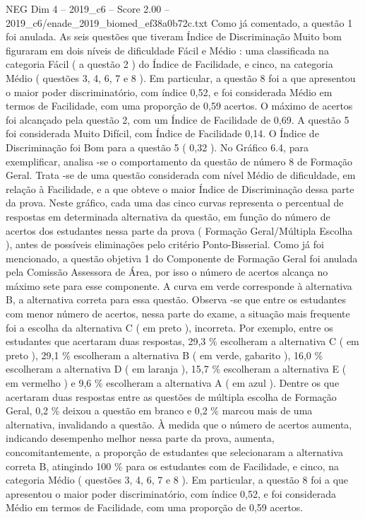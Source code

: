 \begin{textsample}{NEG Dim 4 – 2019\_c6 – Score 2.00 – 2019\_c6/enade\_2019\_biomed\_ef38a0b72c.txt}
Como já comentado, a questão 1 foi anulada.
As seis questões que tiveram Índice de Discriminação Muito bom figuraram em dois níveis de dificuldade Fácil e Médio : uma classificada na categoria Fácil ( a questão 2 ) do Índice de Facilidade, e cinco, na categoria Médio ( questões 3, 4, 6, 7 e 8 ).
Em particular, a questão 8 foi a que apresentou o maior poder discriminatório, com índice 0,52, e foi considerada Médio em termos de Facilidade, com uma proporção de 0,59 acertos.
O máximo de acertos foi alcançado pela questão 2, com um Índice de Facilidade de 0,69.
A questão 5 foi considerada Muito Difícil, com Índice de Facilidade 0,14.
O Índice de Discriminação foi Bom para a questão 5 ( 0,32 ).
No Gráfico 6.4, para exemplificar, analisa -se o comportamento da questão de número 8 de Formação Geral.
Trata -se de uma questão considerada com nível Médio de dificuldade, em relação à Facilidade, e a que obteve o maior Índice de Discriminação dessa parte da prova.
Neste gráfico, cada uma das cinco curvas representa o percentual de respostas em determinada alternativa da questão, em função do número de acertos dos estudantes nessa parte da prova ( Formação Geral/Múltipla Escolha ), antes de possíveis eliminações pelo critério Ponto-Bisserial.
Como já foi mencionado, a questão objetiva 1 do Componente de Formação Geral foi anulada pela Comissão Assessora de Área, por isso o número de acertos alcança no máximo sete para esse componente.
A curva em verde corresponde à alternativa B, a alternativa correta para essa questão.
Observa -se que entre os estudantes com menor número de acertos, nessa parte do exame, a situação mais frequente foi a escolha da alternativa C ( em preto ), incorreta.
Por exemplo, entre os estudantes que acertaram duas respostas, 29,3 \% escolheram a alternativa C ( em preto ), 29,1 \% escolheram a alternativa B ( em verde, gabarito ), 16,0 \% escolheram a alternativa D ( em laranja ), 15,7 \% escolheram a alternativa E ( em vermelho ) e 9,6 \% escolheram a alternativa A ( em azul ).
Dentre os que acertaram duas respostas entre as questões de múltipla escolha de Formação Geral, 0,2 \% deixou a questão em branco e 0,2 \% marcou mais de uma alternativa, invalidando a questão.
À medida que o número de acertos aumenta, indicando desempenho melhor nessa parte da prova, aumenta, concomitantemente, a proporção de estudantes que selecionaram a alternativa correta B, atingindo 100 \% para os estudantes com de Facilidade, e cinco, na categoria Médio ( questões 3, 4, 6, 7 e 8 ).
Em particular, a questão 8 foi a que apresentou o maior poder discriminatório, com índice 0,52, e foi considerada Médio em termos de Facilidade, com uma proporção de 0,59 acertos.

\end{textsample}
